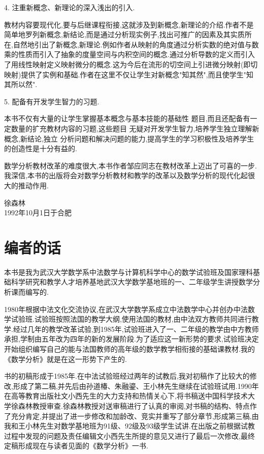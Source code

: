 4. 注重新概念、新理论的深入浅出的引入.

教材内容要现代化,要与后继课程衔接,这就涉及到新概念,新理论的介绍.作者不是简单地罗列新概念,新结论,而是通过分析现实例子,找出可推广的因素及其实质所在,自然地引出了新概念,新理论.例如作者从映射的角度通过分析实数的绝对值与数乘的性质而引入了抽象的度量空间与内积空间的概念.通过分析导数的定义而引入了用线性映射定义映射微分的概念.这为今后在流形的切空间上引进微分映射(即切映射)提供了实例和基础.作者在这里不仅让学生对新概念"知其然",而且使学生"知其所以然".


5. 配备有开发学生智力的习题.

本书不仅有大量的让学生掌握基本概念与基本技能的基础性 题目,而且还配备有一定数量的扩充教材内容的习题,这些题目 无疑对开发学生智力,培养学生独立理解新概念,新结论,独立 分析问题和解决问题的能力,提高学生的学习积极性及培养学生 的创造性是十分有益的.

数学分析教材改革的难度很大,本书作者邹应同志在教材改革上迈出了可喜的一步.我深信,本书的出版将会对数学分析教材和教学的改革以及数学分析的现代化起很大的推动作用.



\begin{flushright}
徐森林
\\1992年10月1日于合肥
\end{flushright}

\endgroup


\chapter{编者的话}

\begingroup
\fangsong

本书是我为武汉大学数学系中法数学与计算机科学中心的数学试验班及国家理科基础科学研究和教学人才培养基地武汉大学数学基地班的一、二年级学生讲授数学分析课而编写的.

1980年根据中法文化交流协议,在武汉大学数学系成立中法数学中心并创办中法数学试验班.试验班按照法国的教学大纲,使用法国的教材,由中法双方教师共同进行教学.经过几年的教学改革试验,到1985年,试验班进入了一、二年级的教学由中方教师承担,学制由五年改为四年的新的发展阶段.为了适应这一新形势的要求,试验班决定开始组织编写自己的能与法国教师的高年级的数学教学相衔接的基础课教材.我的《数学分析》就是在这一形势下产生的.

书的初稿形成于1985年.在中法试验班经过两年的试教后,我对初稿作了比较大的修改,形成了第二稿,并先后由孙道椿、朱融鎏、王小林先生继续在试验班试用.1990年在高等教育出版社文小西先生的大力支持和热情关心下,将书稿送中国科学技术大学徐森林教授审查.徐森林教授对送审稿进行了认真的审阅,对书稿的结构、特点作了充分肯定,并提出了进一步修改和加龄改、竞实并重写了部分章节,形成第三稿,由我和王小林先生对数学基地班为91级、92级及93级学生试讲.在出版之前根据试教过程中发现的问题及责任编辑文小西先生所提的意见又进行了最后一次修改,最终定稿形成现在与读者见面的《数学分析》一书.

